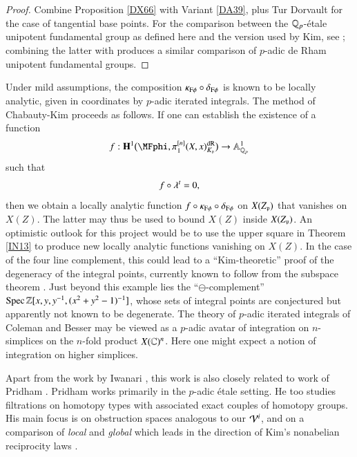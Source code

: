 \begin{proof}
Combine Proposition \ref{DX66} with Variant \ref{DA39}, plus Tur Dorvault \cite{tur2026motivic} for the case of tangential base points. For the comparison between the ${\mathbb{Q}_p}$-\'etale unipotent fundamental group as defined here and the version used by Kim, see \cite{rmps, dan2017rationalCorr}; combining the latter with \cite{DegliseNiziol} produces a similar comparison of $p$-adic de Rham unipotent fundamental groups.
\end{proof}

Under mild assumptions, the composition $\kappa_{\mathrm{F}\phi} \circ \delta_{\mathrm{F}\phi}$ is known to be locally analytic, given in coordinates by $p$-adic iterated integrals. The method of Chabauty-Kim proceeds as follows. If one can establish the existence of a function
\[
f: \mathbf{H}^1 \big( \MFphi, \pi_1^{[n]}(X,x)^\dR_{K_\pP} \big)
\to 
\AA^1_\Qp
\]
such that
\[
f \circ \lambda^t = 0,
\]
then we obtain a locally analytic function $f\circ \kappa_{\mathrm{F}\phi} \circ \delta_{\mathrm{F}\phi}$ on $X(Z_{\mathfrak{p}})$ that vanishes on $X(Z)$. The latter may thus be used to bound $X(Z)$ inside $X(Z_{\mathfrak{p}})$. An optimistic outlook for this project would be to use the upper square in Theorem \ref{IN13} to produce new locally analytic functions vanishing on $X(Z)$. In the case of the four line complement, this could lead to a ``Kim-theoretic'' proof of the degeneracy of the integral points, currently known to follow from the subspace theorem \cite[Theorem 1.2.4]{corvaja2016integral}. Just beyond this example lies the ``$\ominus$-complement'' $\operatorname{Spec} \mathbb{Z}[x,y, y^{-1}, (x^2+y^2-1)^{-1}]$, whose sets of integral points are conjectured \cite[\S1.2, \textit{Vojta's Conjecture}]{corvaja2016integral} but apparently not known to be degenerate. The theory of $p$-adic iterated integrals of Coleman and Besser \cite{Besser, besser2011heidelberg} may be viewed as a $p$-adic avatar of integration on $n$-simplices on the $n$-fold product $X(\mathbb{C})^n$. Here one might expect a notion of integration on higher simplices. 

Apart from the work by Iwanari \cite{Iwanari}, this work is also closely related to work of Pridham \cite{pridham2020nonabelian}. Pridham works primarily in the $p$-adic \'etale setting. He too studies filtrations on homotopy types with associated exact couples of homotopy groups. His main focus is on obstruction spaces analogous to our $\mathcal{V}^i$, and on a comparison of \textit{local} and \textit{global} which leads in the direction of Kim's nonabelian reciprocity laws \cite{kim2015diophantine}. 

